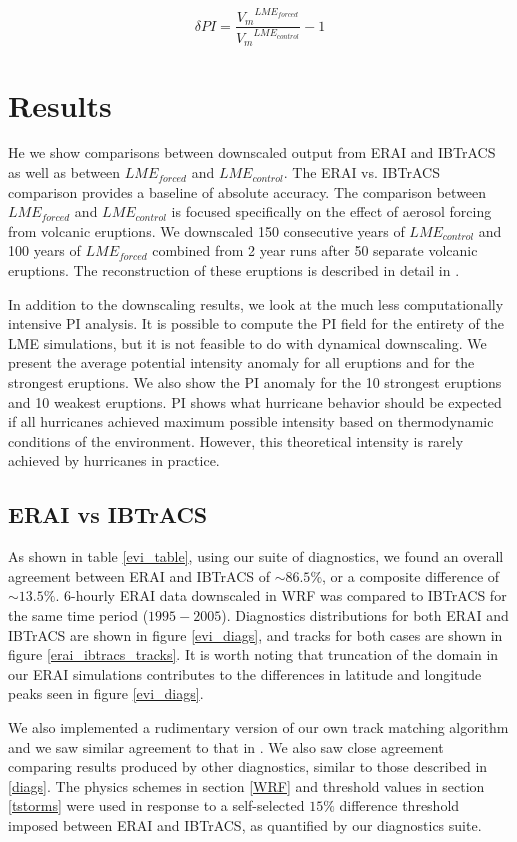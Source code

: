 \documentclass[smallextended]{svjour3}       %
\begin{document}
\begin{equation}
\delta PI = \frac{{V_{m}}^{LME_{forced}}}{{V_{m}}^{LME_{control}}}-1
\label{dpi}
\end{equation}


\section{Results}
\label{results}
He we show comparisons between downscaled output from ERAI and IBTrACS as well as between $LME_{forced}$ and $LME_{control}$. The ERAI vs. IBTrACS comparison provides a baseline of absolute accuracy. The comparison between $LME_{forced}$ and $LME_{control}$ is focused specifically on the effect of aerosol forcing from volcanic eruptions. We downscaled 150 consecutive years of $LME_{control}$ and 100 years of $LME_{forced}$ combined from 2 year runs after 50 separate volcanic eruptions. The reconstruction of these eruptions is described in detail in \cite{erups_recon}. 
\par
In addition to the downscaling results, we look at the much less computationally intensive PI analysis. It is possible to compute the PI field for the entirety of the LME simulations, but it is not feasible to do with dynamical downscaling. We present the average potential intensity anomaly for all eruptions and for the strongest eruptions. We also show the PI anomaly for the 10 strongest eruptions and 10 weakest eruptions. PI shows what hurricane behavior should be expected if all hurricanes achieved maximum possible intensity based on thermodynamic conditions of the environment. However, this theoretical intensity is rarely achieved by hurricanes in practice.

\subsection{ERAI vs IBTrACS}
As shown in table \ref{evi_table}, using our suite of diagnostics, we found an overall agreement between ERAI and IBTrACS of ${\sim}86.5\%$, or a composite difference of ${\sim}13.5\%$. $6$-hourly ERAI data downscaled in WRF was compared to IBTrACS for the same time period ($1995-2005$). Diagnostics distributions for both ERAI and IBTrACS are shown in figure \ref{evi_diags}, and tracks for both cases are shown in figure \ref{erai_ibtracs_tracks}. It is worth noting that truncation of the domain in our ERAI simulations contributes to the differences in latitude and longitude peaks seen in figure \ref{evi_diags}.  
\par
We also implemented a rudimentary version of our own track matching algorithm and we saw similar agreement to that in \cite{hodges2017well}. We also saw close agreement comparing results produced by other diagnostics, similar to those described in \ref{diags}. The physics schemes in section \ref{WRF} and threshold values in section \ref{tstorms} were used in response to a self-selected $15\%$ difference threshold imposed between ERAI and IBTrACS, as quantified by our diagnostics suite. 
\end{document}
